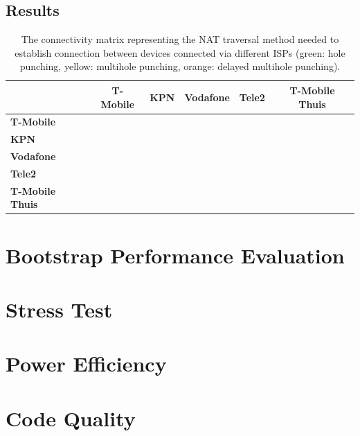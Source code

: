\subsection{Results}

\begin{table}[h!]
    \centering
    \begin{tabular}{ | l | c | c | c | c | c | }
        \hline
        \textbf{} & \textbf{T-Mobile} & \textbf{KPN} & \textbf{Vodafone} & \textbf{Tele2} & \textbf{T-Mobile Thuis} \\
        \hline
        \textbf{T-Mobile} & \cellcolor{green!25} &  &  &  &  \\
        \hline
        \textbf{KPN} & \cellcolor{green!25}& \cellcolor{green!25} &  &  &  \\
        \hline
        \textbf{Vodafone} & \cellcolor{orange!25} & \cellcolor{green!25} & \cellcolor{yellow!25} &  &  \\
        \hline
        \textbf{Tele2} & \cellcolor{green!25} & \cellcolor{green!25} & \cellcolor{green!25} & \cellcolor{green!25} & \\
        \hline
        \textbf{T-Mobile Thuis} & \cellcolor{green!25} & \cellcolor{green!25} & \cellcolor{green!25} & \cellcolor{green!25} & \cellcolor{green!25} \\
        \hline
    \end{tabular}
    \caption{The connectivity matrix representing the NAT traversal method needed to establish connection between devices connected via different ISPs (green: hole punching, yellow: multihole punching, orange: delayed multihole punching).}
    \label{table_cgnat_analysis}
\end{table}

\section{Bootstrap Performance Evaluation}

\section{Stress Test}

\section{Power Efficiency}

\section{Code Quality}

